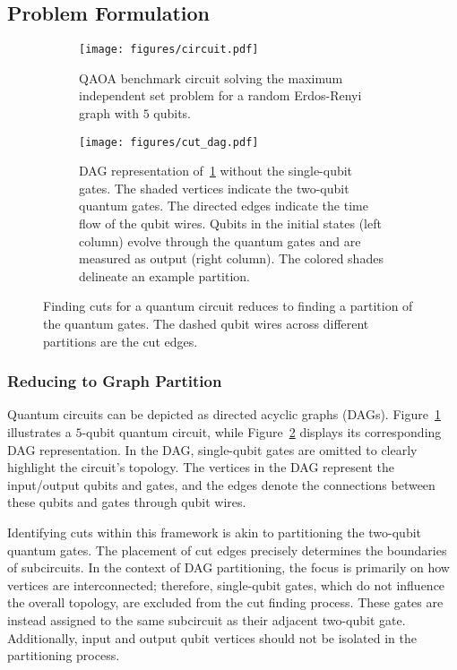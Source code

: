 \subsection{Problem Formulation}
\begin{figure}[t]
    \centering
    \begin{subfigure}{0.5\textwidth}
        \centering
        \texttt{[image: figures/circuit.pdf]}
        \caption{QAOA benchmark circuit solving the maximum independent set problem for a random Erdos-Renyi graph with $5$ qubits.}
        \label{fig:circuit}
    \end{subfigure}
    \begin{subfigure}{0.5\textwidth}
        \centering
        \texttt{[image: figures/cut\_dag.pdf]}
        \caption{DAG representation of~\ref{fig:circuit} without the single-qubit gates.
        The shaded vertices indicate the two-qubit quantum gates.
        The directed edges indicate the time flow of the qubit wires.
        Qubits in the initial states (left column) evolve through the quantum gates and are measured as output (right column).
        The colored shades delineate an example partition.}
        \label{fig:cut_dag}
    \end{subfigure}
       \caption{Finding cuts for a quantum circuit reduces to finding a partition of the quantum gates.
       The dashed qubit wires across different partitions are the cut edges.}
       \label{fig:tensor_graph_example}
\end{figure}

\subsubsection{Reducing to Graph Partition}
Quantum circuits can be depicted as directed acyclic graphs (DAGs).
Figure~\ref{fig:circuit} illustrates a $5$-qubit quantum circuit,
while Figure~\ref{fig:cut_dag} displays its corresponding DAG representation.
In the DAG, single-qubit gates are omitted to clearly highlight the circuit's topology.
The vertices in the DAG represent the input/output qubits and gates,
and the edges denote the connections between these qubits and gates through qubit wires.

Identifying cuts within this framework is akin to partitioning the two-qubit quantum gates.
The placement of cut edges precisely determines the boundaries of subcircuits.
In the context of DAG partitioning,
the focus is primarily on how vertices are interconnected;
therefore, single-qubit gates,
which do not influence the overall topology,
are excluded from the cut finding process.
These gates are instead assigned to the same subcircuit as their adjacent two-qubit gate.
Additionally, input and output qubit vertices should not be isolated in the partitioning process.

